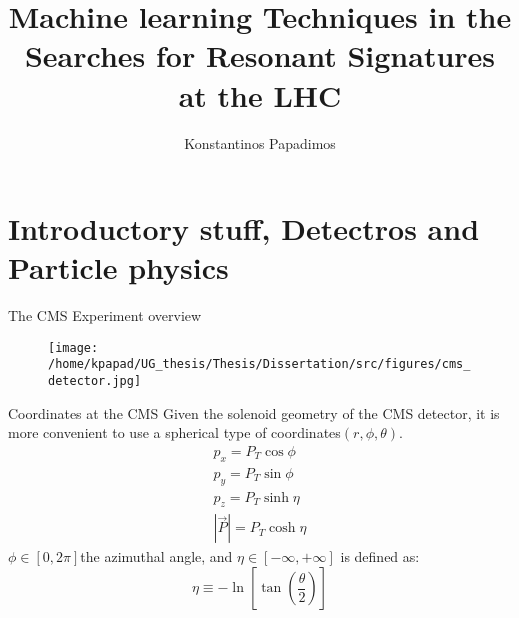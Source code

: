 \documentclass[bigger]{beamer}
\author{Konstantinos Papadimos}
\date{}
\title{Machine learning Techniques in the Searches for Resonant Signatures at the LHC}
\begin{document}
\maketitle

\section{Introductory stuff, Detectros and Particle physics}
\label{sec:org69b98fb}
\begin{frame}[label={sec:orgeb7b4e2}]{The CMS Experiment overview}
\begin{figure}[hb]
\centering
\texttt{[image: /home/kpapad/UG\_thesis/Thesis/Dissertation/src/figures/cms\_detector.jpg]}
\end{figure}
\end{frame}

\begin{frame}[label={sec:orgff68f95}]{Coordinates at the CMS}
Given the solenoid geometry of the CMS detector, it is more convenient to use a spherical type of coordinates\(\left(r, \phi, \theta \right)\).
\begin{equation}
\begin{matrix}
p_{x} = P_{T}\cos{\phi} \\
p_{y} = P_{T}\sin{\phi} \\
p_{z} = P_{T}\sinh{\eta}\\
|\vec{P}| = P_{T}\cosh{\eta} 
\end{matrix}
\end{equation}
\(\phi \in \left [ 0, 2\pi \right]\)the azimuthal angle, and \(\eta\in \left [ -\infty, +\infty \right ]\) is defined as:
\begin{equation}
\eta \equiv -\ln{\left [ \tan\left (\frac{\theta}{2} \right ) \right]  }
\end{equation}
\end{frame}
\end{document}
